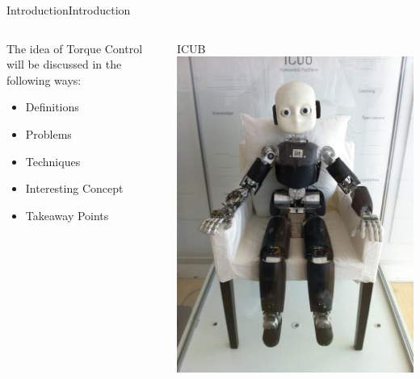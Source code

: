 \documentclass{beamer}
\begin{document}
\begin{frame}{Introduction}{Introduction}
\begin{columns}
    \begin{column}{0.47\textwidth}
The idea of Torque Control will be discussed in the following ways:
\begin{itemize}
	\item Definitions
	\item Problems
	\item Techniques  
	\item Interesting Concept
	\item Takeaway Points
\end{itemize}	
    \end{column}
    \begin{column}{0.5\textwidth}
    		\centering
    		ICUB\footnotemark[1]
        \includegraphics[scale=.15]{./images/creepy_cub.jpg}
    \end{column}
	
\end{columns}  

\end{frame}
\end{document}
